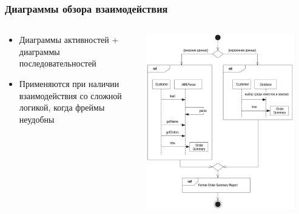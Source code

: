 \documentclass{../mcsslides}
\begin{document}
    \begin{frame}
        \frametitle{Диаграммы обзора взаимодействия}
        \begin{columns}
            \begin{column}{0.5\textwidth}
                \begin{itemize}
                    \item Диаграммы активностей + диаграммы последовательностей
                    \item Применяются при наличии взаимодействия со сложной логикой, когда фреймы неудобны
                \end{itemize}
            \end{column}
            \begin{column}{0.5\textwidth}
                \begin{center}
                    \includegraphics[width=0.9\textwidth]{interactionOverviewDiagrams.png}
                \end{center}
            \end{column}
        \end{columns}
    \end{frame}
\end{document}
